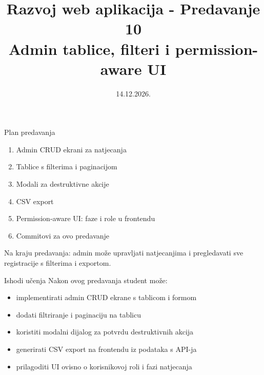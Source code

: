 

\title[Razvoj web aplikacija]{Razvoj web aplikacija - Predavanje 10 \\ Admin tablice, filteri i permission-aware UI}
\date{14.12.2026.}



\frame{\titlepage}

\begin{frame}{Plan predavanja}
\begin{enumerate}
  \item Admin CRUD ekrani za natjecanja
  \item Tablice s filterima i paginacijom
  \item Modali za destruktivne akcije
  \item CSV export
  \item Permission-aware UI: faze i role u frontendu
  \item Commitovi za ovo predavanje
\end{enumerate}

\vspace{0.6em}
Na kraju predavanja: admin može upravljati natjecanjima i pregledavati sve registracije s filterima i exportom.
\end{frame}

\begin{frame}{Ishodi učenja}
Nakon ovog predavanja student može:
\begin{itemize}
  \item implementirati admin CRUD ekrane s tablicom i formom
  \item dodati filtriranje i paginaciju na tablicu
  \item koristiti modalni dijalog za potvrdu destruktivnih akcija
  \item generirati CSV export na frontendu iz podataka s API-ja
  \item prilagoditi UI ovisno o korisnikovoj roli i fazi natjecanja
\end{itemize}
\end{frame}

